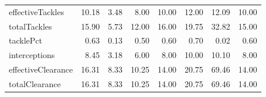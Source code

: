 \begin{table}[H]
\begin{tabular}{lrrrrrrr}
effectiveTackles & 10.18 & 3.48 & 8.00 & 10.00 & 12.00 & 12.09 & 10.00 \\
totalTackles & 15.90 & 5.73 & 12.00 & 16.00 & 19.75 & 32.82 & 15.00 \\
tacklePct & 0.63 & 0.13 & 0.50 & 0.60 & 0.70 & 0.02 & 0.60 \\
interceptions & 8.45 & 3.18 & 6.00 & 8.00 & 10.00 & 10.10 & 8.00 \\
effectiveClearance & 16.31 & 8.33 & 10.25 & 14.00 & 20.75 & 69.46 & 14.00 \\
totalClearance & 16.31 & 8.33 & 10.25 & 14.00 & 20.75 & 69.46 & 14.00 \\
\hline
\end{tabular}
\end{table}
